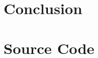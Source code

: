 \documentclass[runningheads]{llncs}
\begin{document}
\section{Conclusion}

\newpage
\appendix
\section{Source Code}

% 
\end{document}
